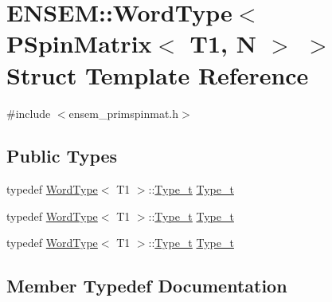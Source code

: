 \hypertarget{structENSEM_1_1WordType_3_01PSpinMatrix_3_01T1_00_01N_01_4_01_4}{}\section{E\+N\+S\+EM\+:\+:Word\+Type$<$ P\+Spin\+Matrix$<$ T1, N $>$ $>$ Struct Template Reference}
\label{structENSEM_1_1WordType_3_01PSpinMatrix_3_01T1_00_01N_01_4_01_4}


{\ttfamily \#include $<$ensem\+\_\+primspinmat.\+h$>$}

\subsection*{Public Types}
\begin{DoxyCompactItemize}
\item 
typedef \mbox{\hyperlink{structENSEM_1_1WordType}{Word\+Type}}$<$ T1 $>$\+::\mbox{\hyperlink{structENSEM_1_1WordType_3_01PSpinMatrix_3_01T1_00_01N_01_4_01_4_a497367a5083738a899e7e09e43127eec}{Type\+\_\+t}} \mbox{\hyperlink{structENSEM_1_1WordType_3_01PSpinMatrix_3_01T1_00_01N_01_4_01_4_a497367a5083738a899e7e09e43127eec}{Type\+\_\+t}}
\item 
typedef \mbox{\hyperlink{structENSEM_1_1WordType}{Word\+Type}}$<$ T1 $>$\+::\mbox{\hyperlink{structENSEM_1_1WordType_3_01PSpinMatrix_3_01T1_00_01N_01_4_01_4_a497367a5083738a899e7e09e43127eec}{Type\+\_\+t}} \mbox{\hyperlink{structENSEM_1_1WordType_3_01PSpinMatrix_3_01T1_00_01N_01_4_01_4_a497367a5083738a899e7e09e43127eec}{Type\+\_\+t}}
\item 
typedef \mbox{\hyperlink{structENSEM_1_1WordType}{Word\+Type}}$<$ T1 $>$\+::\mbox{\hyperlink{structENSEM_1_1WordType_3_01PSpinMatrix_3_01T1_00_01N_01_4_01_4_a497367a5083738a899e7e09e43127eec}{Type\+\_\+t}} \mbox{\hyperlink{structENSEM_1_1WordType_3_01PSpinMatrix_3_01T1_00_01N_01_4_01_4_a497367a5083738a899e7e09e43127eec}{Type\+\_\+t}}
\end{DoxyCompactItemize}


\subsection{Member Typedef Documentation}
\mbox{\label{structENSEM_1_1WordType_3_01PSpinMatrix_3_01T1_00_01N_01_4_01_4_a497367a5083738a899e7e09e43127eec}} 

